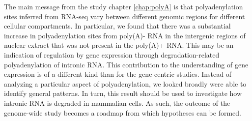 The main message from the study chapter \ref{chap:polyA} is that
polyadenylation sites inferred from RNA-seq vary between different genomic
regions for different cellular compartments. In particular, we found that there
was a substantial increase in polyadenylation sites from poly(A)- RNA in the
intergenic regions of nuclear extract that was not present in the poly(A)+ RNA.
This may be an indication of regulation by gene expression through
degradation-related polyadenylation of intronic RNA. This contribution to the
understanding of gene expression is of a different kind than for the
gene-centric studies. Instead of analyzing a particular aspect of
polyadenylation, we looked broadly were able to identify general patterns. In
turn, this result should be used to investigate how intronic RNA is degraded in
mammalian cells. As such, the outcome of the genome-wide study becomes a
roadmap from which hypotheses can be formed.


